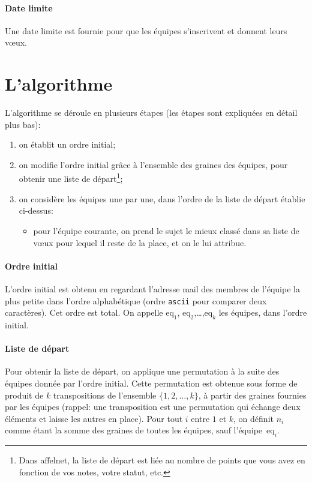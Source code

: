 \documentclass{article}
\newcommand{\nbeq}{k}
\newcommand{\eq}[1]{\text{eq}_{#1}}
\begin{document}
\paragraph{Date limite}
Une date limite est fournie pour que les \'equipes s'inscrivent et
donnent leurs v\oe ux.

\section{L'algorithme}
L'algorithme se d\'eroule en plusieurs \'etapes (les \'etapes sont
expliqu\'ees en d\'etail plus bas):
\begin{enumerate}
\item on \'etablit un ordre initial;
\item on modifie l'ordre initial gr\^ace \`a l'ensemble des graines
  des \'equipes, pour obtenir une liste de d\'epart\footnote{Dans
    affelnet, la liste de d\'epart est li\'ee au nombre de points que
    vous avez en fonction de vos notes, votre statut, etc.};
\item on consid\`ere les \'equipes une par une, dans l'ordre de la
  liste de d\'epart \'etablie ci-dessus:
  \begin{itemize}
    \item pour l'\'equipe courante, on prend le sujet le mieux
      class\'e dans sa liste de v\oe ux pour lequel il reste de la
      place, et on le lui attribue.
  \end{itemize}
\end{enumerate}

\paragraph{Ordre initial}
L'ordre initial est obtenu en regardant l'adresse mail des membres de
l'\'equipe la plus petite dans l'ordre alphab\'etique (ordre
\texttt{ascii} pour comparer deux caract\`eres). Cet ordre est
total. On appelle \(\eq{1}\), \(\eq{2}\),\ldots ,\(\eq{\nbeq}\) les
\'equipes, dans l'ordre initial.

\paragraph{Liste de d\'epart}
Pour obtenir la liste de d\'epart, on applique une permutation \`a la
suite des \'equipes donn\'ee par l'ordre initial. Cette permutation
est obtenue sous forme de produit de \(\nbeq\) transpositions de
l'ensemble \(\{1,2,\ldots,\nbeq\}\), \`a partir des graines fournies
par les \'equipes (rappel: une transposition est une permutation qui
\'echange deux \'el\'ements et laisse les autres en place). Pour tout
\(i\) entre \(1\) et \(k\), on d\'efinit \(n_i\) comme \'etant la
somme des graines de toutes les \'equipes, sauf
l'\'equipe~\(\eq{i}\).
\end{document}

